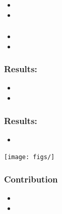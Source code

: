 \documentclass[red]{beamer}
\begin{document}

\begin{frame}
\frametitle{}
\begin{itemize}
\item 
\item 
\end{itemize}
\end{frame}

\begin{frame}
\frametitle{}
\begin{itemize}
\item 
\item 
\end{itemize}
\end{frame}

\begin{frame}
\frametitle{Results:}
\begin{itemize}
\item 
\item 
\end{itemize}
\end{frame}

\begin{frame}
\frametitle{Results:}
\begin{itemize}
\item 
\end{itemize}
\begin{center}
\texttt{[image: figs/]}
\end{center}
\end{frame}

\begin{frame}
\frametitle{Contribution}
\begin{itemize}
\item 
\item 
\end{itemize}
\end{frame}
\end{document}
